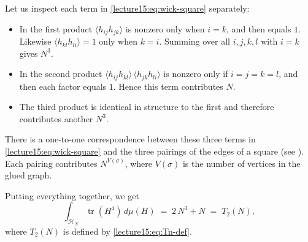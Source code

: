 \documentclass[letterpaper,11pt,oneside,reqno]{book}
\numberwithin{equation}{chapter}  %
\theoremstyle{definition}
\begin{document}
Let us inspect each term in \eqref{lecture15:eq:wick-square} separately:
\begin{itemize}
  \item In the first product
        $\langle h_{ij}h_{jk}\rangle$ is nonzero only when $i=k$, and then equals $1$.
        Likewise $\langle h_{kl}h_{li}\rangle=1$ only when $k=i$.  Summing over all $i,j,k,l$
        with $i=k$ gives $N^3$.

  \item In the second product
        $\langle h_{ij}h_{kl}\rangle\,\langle h_{jk}h_{li}\rangle$ is nonzero
        only if $i=j=k=l$, and then each factor equals $1$.  Hence this term contributes $N$.

  \item The third product is identical in structure to the first and therefore contributes another $N^3$.
\end{itemize}
There is a one‐to‐one correspondence between these three terms in \eqref{lecture15:eq:wick-square}
and the three pairings of the edges of a square (see ).  Each pairing contributes
$N^{V(\sigma)}$, where $V(\sigma)$ is the number of vertices in the glued graph.

Putting everything together, we get
\[
  \int_{\mathcal{H}_N}\!\operatorname{tr}(H^4)\,d\mu(H)
  \;=\;
  2\,N^3 + N
  \;=\;
	T_2(N),
\]
where $T_2(N)$ is defined by \eqref{lecture15:eq:Tn-def}.
\end{document}

